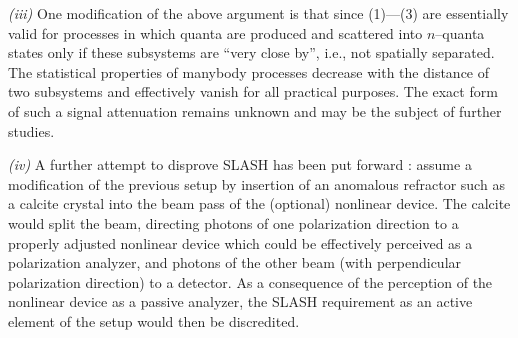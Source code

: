  {\it (iii)} One modification of the above argument is that since
 (1)---(3) are essentially valid for processes in which quanta are
 produced and scattered into $n$--quanta states only if these
 subsystems
 are ``very close by'', i.e., not spatially separated.  The statistical
 properties of manybody processes decrease with the distance of two
 subsystems and effectively vanish for all practical purposes.
The exact form of such a signal attenuation remains unknown and may be the subject of further
studies.



 {\it (iv)}
 A further attempt to disprove SLASH has been put forward
 \cite{herbert-priv}: assume a modification of the previous setup
 by
 insertion of an anomalous refractor such as a calcite crystal into the
 beam pass of the (optional) nonlinear device. The calcite would
 split the beam, directing photons of one polarization direction to a
 properly adjusted
 nonlinear device which could be effectively perceived as a
 polarization analyzer, and photons of the
 other beam (with perpendicular polarization direction) to a detector.
 As a consequence of
 the perception of the nonlinear device as a passive analyzer,
 the SLASH requirement as an active element of the setup would then be
 discredited.

